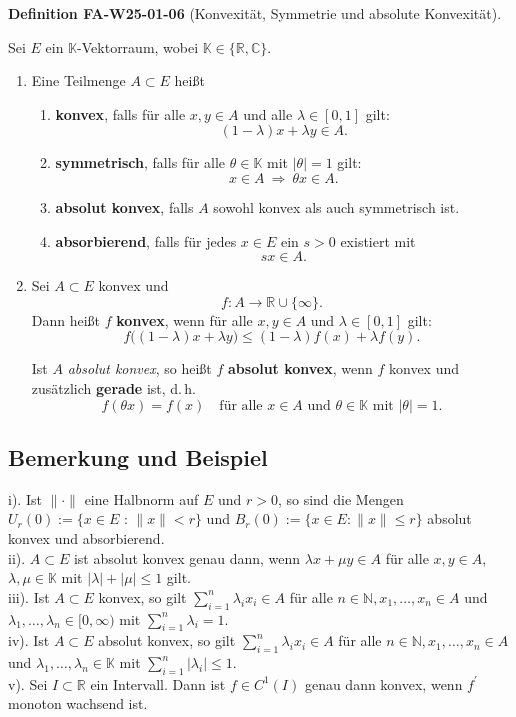 \documentclass[10pt, letterpaper]{article}
\newcommand{\CustomHeading}[3]{%
  \par\medskip\noindent%
  \textbf{#1 #2} \textnormal{(#3)}.\enskip%
}
\newenvironment{DEF}[2]{\begin{unitbox}\CustomHeading{Definition}{#1}{#2}}{\end{unitbox}}
\begin{document}
\begin{DEF}{FA-W25-01-06}{Konvexität, Symmetrie und absolute Konvexität}
Sei $E$ ein $\mathbb{K}$-Vektorraum, wobei $\mathbb{K}\in\{\mathbb{R},\mathbb{C}\}$.

\begin{enumerate}
\item[(a)] Eine Teilmenge $A\subset E$ heißt
\begin{enumerate}
\item[(i)] \textbf{konvex}, falls für alle $x,y\in A$ und alle $\lambda\in[0,1]$ gilt:
\[
(1-\lambda)x+\lambda y \in A.
\]

\item[(ii)] \textbf{symmetrisch}, falls für alle $\theta\in\mathbb{K}$ mit $|\theta|=1$ gilt:
\[
x\in A \ \Longrightarrow\ \theta x\in A.
\]

\item[(iii)] \textbf{absolut konvex}, falls $A$ sowohl konvex als auch symmetrisch ist.

\item[(iv)] \textbf{absorbierend}, falls für jedes $x\in E$ ein $s>0$ existiert mit
\[
s x \in A.
\]
\end{enumerate}

\item[(b)] Sei $A\subset E$ konvex und
\[
f:A\longrightarrow\mathbb{R}\cup\{\infty\}.
\]
Dann heißt $f$ \textbf{konvex}, wenn für alle $x,y\in A$ und $\lambda\in[0,1]$ gilt:
\[
f\bigl((1-\lambda)x+\lambda y\bigr)\le (1-\lambda)f(x)+\lambda f(y).
\]

Ist $A$ \emph{absolut konvex}, so heißt $f$ \textbf{absolut konvex}, wenn $f$ konvex und zusätzlich \textbf{gerade} ist, d.\,h.
\[
f(\theta x)=f(x)\quad\text{für alle }x\in A\text{ und }\theta\in\mathbb{K}\text{ mit }|\theta|=1.
\]
\end{enumerate}
\end{DEF}



\subsection*{Bemerkung und Beispiel}
i). Ist $\|\cdot\|$ eine Halbnorm auf $E$ und $r>0$, so sind die Mengen $U_{r}(0):=\{x \in E$ : $\|x\|<r\}$ und $B_{r}(0):=\{x \in E:\|x\| \leq r\}$ absolut konvex und absorbierend.\\
ii). $A \subset E$ ist absolut konvex genau dann, wenn $\lambda x+\mu y \in A$ für alle $x, y \in A$, $\lambda, \mu \in \mathbb{K}$ mit $|\lambda|+|\mu| \leq 1$ gilt.\\
iii). Ist $A \subset E$ konvex, so gilt $\sum_{i=1}^{n} \lambda_{i} x_{i} \in A$ für alle $n \in \mathbb{N}, x_{1}, \ldots, x_{n} \in A$ und $\lambda_{1}, \ldots, \lambda_{n} \in[0, \infty)$ mit $\sum_{i=1}^{n} \lambda_{i}=1$.\\
iv). Ist $A \subset E$ absolut konvex, so gilt $\sum_{i=1}^{n} \lambda_{i} x_{i} \in A$ für alle $n \in \mathbb{N}, x_{1}, \ldots, x_{n} \in A$ und $\lambda_{1}, \ldots, \lambda_{n} \in \mathbb{K}$ mit $\sum_{i=1}^{n}\left|\lambda_{i}\right| \leq 1$.\\
v). Sei $I \subset \mathbb{R}$ ein Intervall. Dann ist $f \in C^{1}(I)$ genau dann konvex, wenn $f^{\prime}$ monoton wachsend ist.
\end{document}
